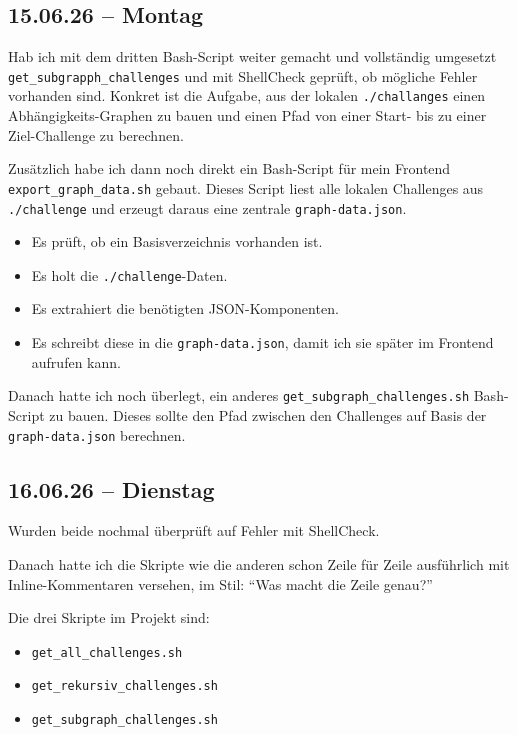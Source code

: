 {\small
\subsection{15.06.26 -- Montag}

Hab ich mit dem dritten Bash-Script weiter gemacht und vollständig umgesetzt \texttt{get\_subgrapph\_challenges} und mit ShellCheck geprüft, ob mögliche Fehler vorhanden sind.
Konkret ist die Aufgabe, aus der lokalen \texttt{./challanges} einen Abhängigkeits-Graphen zu bauen und einen Pfad von einer Start- bis zu einer Ziel-Challenge zu berechnen.

Zusätzlich habe ich dann noch direkt ein Bash-Script für mein Frontend \texttt{export\_graph\_data.sh} gebaut.
Dieses Script liest alle lokalen Challenges aus \texttt{./challenge} und erzeugt daraus eine zentrale \texttt{graph-data.json}.

\begin{itemize}
    \item Es prüft, ob ein Basisverzeichnis vorhanden ist.
    \item Es holt die \texttt{./challenge}-Daten.
    \item Es extrahiert die benötigten JSON-Komponenten.
    \item Es schreibt diese in die \texttt{graph-data.json}, damit ich sie später im Frontend aufrufen kann.
\end{itemize}

Danach hatte ich noch überlegt, ein anderes \texttt{get\_subgraph\_challenges.sh} Bash-Script zu bauen.
Dieses sollte den Pfad zwischen den Challenges auf Basis der \texttt{graph-data.json} berechnen.

\subsection{16.06.26 -- Dienstag}

Wurden beide nochmal überprüft auf Fehler mit ShellCheck.

Danach hatte ich die Skripte wie die anderen schon Zeile für Zeile ausführlich mit Inline-Kommentaren versehen, im Stil: ``Was macht die Zeile genau?''

Die drei Skripte im Projekt sind:
\begin{itemize}
    \item \texttt{get\_all\_challenges.sh}
    \item \texttt{get\_rekursiv\_challenges.sh}
    \item \texttt{get\_subgraph\_challenges.sh}
\end{itemize}

}
